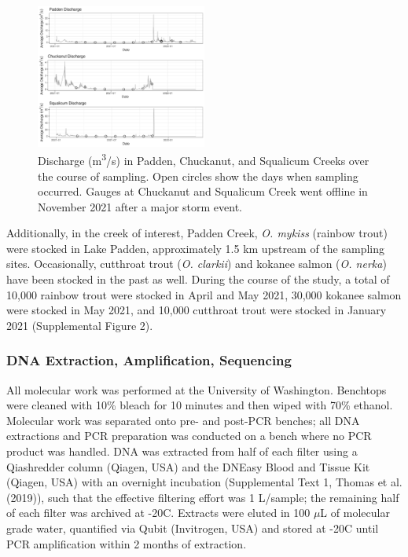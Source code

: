 \documentclass[
]{article}
\begin{document}
\begin{figure}
\centering
\includegraphics[width=0.5\textwidth,height=\textheight]{../Output/Figures/flow_gauges.png}
\caption{Discharge (m\textsuperscript{3}/s) in Padden, Chuckanut, and
Squalicum Creeks over the course of sampling. Open circles show the days
when sampling occurred. Gauges at Chuckanut and Squalicum Creek went
offline in November 2021 after a major storm event.\label{fig:flows}}
\end{figure}

Additionally, in the creek of interest, Padden Creek, \emph{O. mykiss}
(rainbow trout) were stocked in Lake Padden, approximately 1.5 km
upstream of the sampling sites. Occasionally, cutthroat trout (\emph{O.
clarkii}) and kokanee salmon (\emph{O. nerka}) have been stocked in the
past as well. During the course of the study, a total of 10,000 rainbow
trout were stocked in April and May 2021, 30,000 kokanee salmon were
stocked in May 2021, and 10,000 cutthroat trout were stocked in January
2021 (Supplemental Figure 2).

\hypertarget{dna-extraction-amplification-sequencing}{%
\subsubsection{DNA Extraction, Amplification,
Sequencing}\label{dna-extraction-amplification-sequencing}}

All molecular work was performed at the University of Washington.
Benchtops were cleaned with 10\% bleach for 10 minutes and then wiped
with 70\% ethanol. Molecular work was separated onto pre- and post-PCR
benches; all DNA extractions and PCR preparation was conducted on a
bench where no PCR product was handled. DNA was extracted from half of
each filter using a Qiashredder column (Qiagen, USA) and the DNEasy
Blood and Tissue Kit (Qiagen, USA) with an overnight incubation
(Supplemental Text 1, Thomas et al. (2019)), such that the effective
filtering effort was 1 L/sample; the remaining half of each filter was
archived at -20\degree C. Extracts were eluted in 100 \(\mu\)L of
molecular grade water, quantified via Qubit (Invitrogen, USA) and stored
at -20\degree C until PCR amplification within 2 months of extraction.
\end{document}
